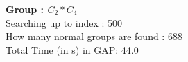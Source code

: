\textbf{Group : $C_2*C_4$}\\
Searching up to index : 500\\
How many normal groups are found : 688\\
Total Time (in s) in GAP: 44.0\\
